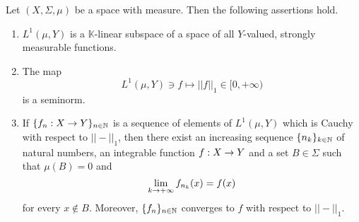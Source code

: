 \begin{theorem}[Riesz]\label{theorem:riesztheorem}
Let $(X,\Sigma,\mu)$ be a space with measure. Then the following assertions hold.
\begin{enumerate}[label=\emph{\textbf{(\arabic*)}}, leftmargin=*]
\item $L^1(\mu,Y)$ is a $\mathbb{K}$-linear subspace of a space of all $Y$-valued, strongly measurable functions.
\item The map
$$L^1(\mu,Y)\ni f \mapsto ||f||_1\in [0,+\infty)$$
is a seminorm.
\item If $\{f_n:X\rightarrow Y\}_{n\in {\mathbb N}}$ is a sequence of elements of $L^1(\mu,Y)$ which is Cauchy with respect to $||-||_1$, then there exist an increasing sequence $\{n_k\}_{k\in {\mathbb N}}$ of natural numbers, an integrable function $f:X\rightarrow Y$ and a set $B\in \Sigma$ such that $\mu(B) = 0$ and
$$\lim_{k\rightarrow +\infty}f_{n_k}(x) = f(x)$$
for every $x \not \in B$. Moreover, $\{f_n\}_{n\in {\mathbb N}}$ converges to $f$ with respect to $||-||_1$.
\end{enumerate}
\end{theorem}
